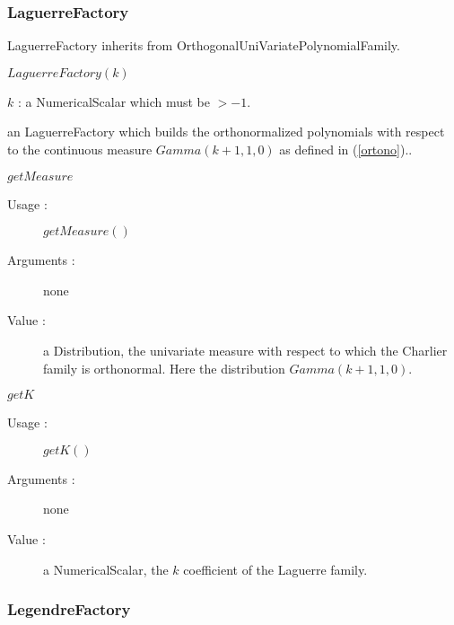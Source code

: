 \newpage
\subsubsection{LaguerreFactory}

LaguerreFactory inherits from OrthogonalUniVariatePolynomialFamily.

\begin{description}
\item[Usage :] $LaguerreFactory(k)$


\item[Arguments :]  $k$ : a NumericalScalar which must be $> -1$.

\item[Value :]  an LaguerreFactory  which builds the orthonormalized polynomials with respect to the continuous measure $Gamma(k+1,1,0)$ as defined in (\ref{ortono})..

\item[Some methods :]  \rule{0pt}{1em}

  \begin{description}
  \item $getMeasure$
    \begin{description}
    \item[Usage :] $getMeasure()$
    \item[Arguments :] none
    \item[Value :]  a Distribution, the univariate measure with respect to which the Charlier family is orthonormal. Here the  distribution $Gamma(k+1,1,0)$.
    \end{description}
    \bigskip

  \item $getK$
    \begin{description}
    \item[Usage :] $getK()$
    \item[Arguments :] none
    \item[Value :]  a NumericalScalar, the $k$ coefficient of the Laguerre family.
    \end{description}

  \end{description}
\end{description}

\newpage \subsubsection{LegendreFactory}


